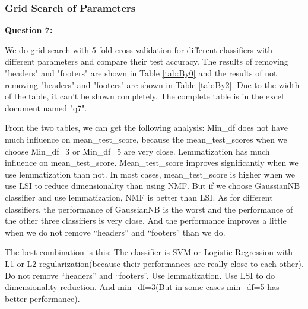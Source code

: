 \documentclass[11pt]{article}
\begin{document}
\subsubsection{Grid Search of Parameters}

\textbf{Question 7:}

We do grid search with 5-fold cross-validation for different classifiers with different parameters and compare their test accuracy. The results of removing "headers" and "footers" are shown in Table \ref{tab:By0} and the results of not removing "headers" and "footers" are shown in Table \ref{tab:By2}. Due to the width of the table, it can't be shown completely. The complete table is in the excel document named "q7".

\bigbreak

From the two tables, we can get the following analysis: Min\_df does not have much influence on mean\_test\_score, because the mean\_test\_scores when we choose Min\_df=3 or Min\_df=5 are very close. Lemmatization has much influence on mean\_test\_score. Mean\_test\_score improves significantly when we use lemmatization than not. In most cases, mean\_test\_score is higher when we use LSI to reduce dimensionality than using NMF. But if we choose GaussianNB classifier and use lemmatization, NMF is better than LSI. As for different classifiers, the performance of GaussianNB is the worst and the performance of the other three classifiers is very close. And the performance improves a little when we do not remove “headers” and “footers” than we do. 

\bigbreak

The best combination is this: The classifier is SVM or Logistic Regression with L1 or L2 regularization(because their performances are really close to each other). Do not remove “headers” and “footers”. Use lemmatization. Use LSI to do dimensionality reduction.
And min\_df=3(But in some cases min\_df=5 has better performance).

\bigbreak
\end{document}
